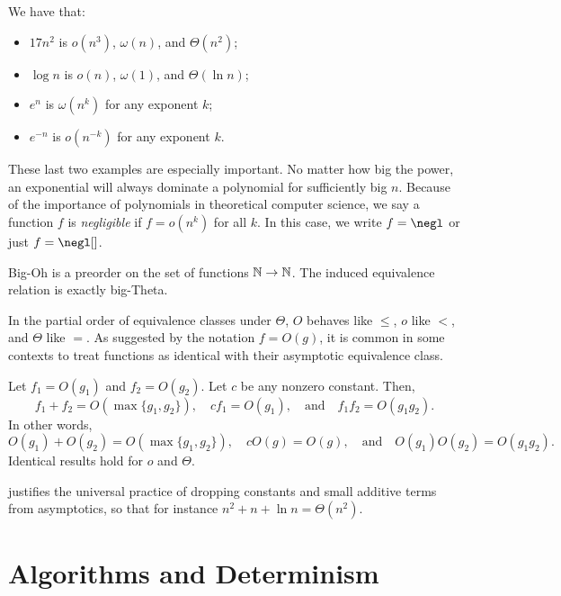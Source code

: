 \begin{ex}We have that:
  \begin{itemize}
    \item $17n^2$ is $o(n^3)$, $\omega(n)$, and $\Theta(n^2)$;
    \item $\log n$ is $o(n)$, $\omega(1)$, and $\Theta(\ln n)$;
    \item $e^n$ is $\omega(n^k)$ for any exponent $k$;
    \item $e^{-n}$ is $o(n^{-k})$ for any exponent $k$.
  \end{itemize}

  These last two examples are especially important. No matter how big the power,
  an exponential will always dominate a polynomial for sufficiently big $n$.
  Because of the importance of polynomials in theoretical computer science, we
  say a function $f$ is \emph{negligible} if $f = o(n^k)$ for all $k$. In this
  case, we write $f = \negl$ or just $f = \negl[]$.
\end{ex}

\begin{prop}
  Big-Oh is a preorder on the set of functions $\mathbb{N}\to\mathbb{N}$. The induced
  equivalence relation is exactly big-Theta.
\end{prop}

In the partial order of equivalence classes under $\Theta$, $O$ behaves like
$\leq$, $o$ like $<$, and $\Theta$ like $=$. As suggested by the notation $f =
O(g)$, it is common in some contexts to treat functions as identical with their
asymptotic equivalence class.

\begin{prop}\label{thm:asymptotic closure}
  Let $f_1 = O(g_1)$ and $f_2 = O(g_2)$. Let $c$ be any nonzero constant. Then,
  \[
    f_1 + f_2 = O(\max\{g_1,g_2\}),\quad
    cf_1 = O(g_1),\quad\text{and}\quad
    f_1f_2 = O(g_1g_2).
  \]
  In other words, \[
    O(g_1) + O(g_2) = O(\max\{g_1,g_2\}),\quad cO(g) = O(g),\quad\text{and}\quad O(g_1)O(g_2) = O(g_1g_2).
  \]
  Identical results hold for $o$ and $\Theta$.
\end{prop}

 justifies the universal practice
of dropping constants and small additive terms from asymptotics, so that for
instance $n^2 + n + \ln n = \Theta(n^2)$.

\section{Algorithms and Determinism}

